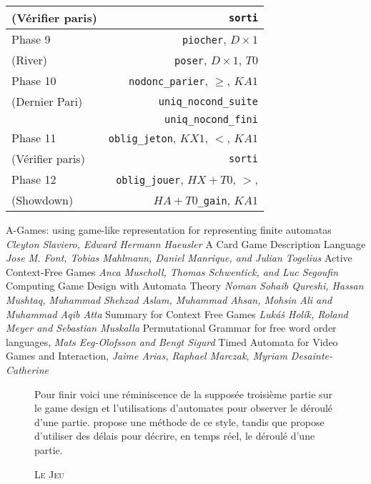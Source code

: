 \documentclass{cours}
\begin{document}
\begin{table}
\begin{tabular}{lr}
        (Vérifier paris) & \texttt{sorti}\\
        \midrule
        Phase 9 & \texttt{piocher}, $D \times 1$\\
        (River) & \texttt{poser}, $D\times 1$, $T0$\\
        \midrule
        Phase 10 & \texttt{nodonc\_parier}, $\geq$, $KA1$\\
        (Dernier Pari) & \texttt{uniq\_nocond\_suite}\\
        & \texttt{uniq\_nocond\_fini}\\
        \midrule
        Phase 11 & \texttt{oblig\_jeton}, $KX1$, $<$, $KA1$\\
        (Vérifier paris) & \texttt{sorti}\\
        \midrule
        Phase 12 & \texttt{oblig\_jouer}, $HX + T0$, $>$,\\
        (Showdown) & $HA + T0$\texttt{\_gain}, $KA1$\\
        \bottomrule
    \end{tabular}
\end{table}

\newpage
\begin{thebibliography}{5}
     A-Games: using game-like representation for representing finite automatas \textit{Cleyton Slaviero, Edward Hermann Haeusler}
     A Card Game Description Language \textit{Jose M. Font, Tobias Mahlmann, Daniel Manrique, and Julian Togelius}
     Active Context-Free Games \textit{Anca Muscholl, Thomas Schwentick, and Luc Segoufin}
     Computing Game Design with Automata Theory \textit{Noman Sohaib Qureshi, Hassan Mushtaq, Muhammad Shehzad Aslam, Muhammad Ahsan, Mohsin Ali and Muhammad Aqib Atta}
     Summary for Context Free Games \textit{Lukáš Holík, Roland Meyer and Sebastian Muskalla}
     Permutational Grammar for free word order languages, \textit{Mats Eeg-Olofsson and Bengt Sigurd}
     Timed Automata for Video Games and Interaction, \textit{Jaime Arias, Raphael Marczak, Myriam Desainte-Catherine}
\end{thebibliography}

\begin{figure}
    \centering
    \caption{\textsc{Le Jeu}}
    \label{fig:dfa:lejeu}
    Pour finir voici une réminiscence de la supposée troisième partie sur le game design et l'utilisations d'automates pour observer le déroulé d'une partie. \cite{game-desing-automata} propose une méthode de ce style, tandis que \cite{timed-automatas-games} propose d'utiliser des délais pour décrire, en temps réel, le déroulé d'une partie. 
\end{figure}
\end{document}
